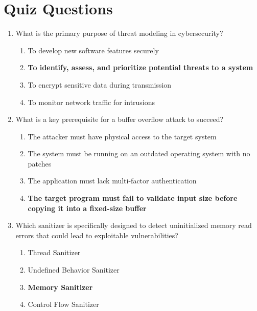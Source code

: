 \newpage

\section{Quiz Questions}

\begin{enumerate}
    \item What is the primary purpose of threat modeling in cybersecurity?
    \begin{enumerate}
        \item To develop new software features securely
        \item \textbf{To identify, assess, and prioritize potential threats to a
              system}
        \item To encrypt sensitive data during transmission
        \item To monitor network traffic for intrusions
    \end{enumerate}

    \item What is a key prerequisite for a buffer overflow attack to succeed?
    \begin{enumerate}
        \item The attacker must have physical access to the target system
        \item The system must be running on an outdated operating system with no
              patches
        \item The application must lack multi-factor authentication
        \item \textbf{The target program must fail to validate input size before
              copying it into a fixed-size buffer}
    \end{enumerate}

    \item Which sanitizer is specifically designed to detect uninitialized
          memory read errors that could lead to exploitable vulnerabilities?
    \begin{enumerate}
        \item Thread Sanitizer
        \item Undefined Behavior Sanitizer
        \item \textbf{Memory Sanitizer}
        \item Control Flow Sanitizer
    \end{enumerate}


\end{enumerate}
